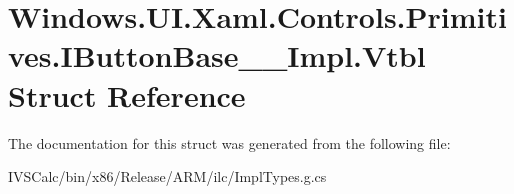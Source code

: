 \hypertarget{struct_windows_1_1_u_i_1_1_xaml_1_1_controls_1_1_primitives_1_1_i_button_base_____impl_1_1_vtbl}{}\section{Windows.\+U\+I.\+Xaml.\+Controls.\+Primitives.\+I\+Button\+Base\+\_\+\+\_\+\+Impl.\+Vtbl Struct Reference}
\label{struct_windows_1_1_u_i_1_1_xaml_1_1_controls_1_1_primitives_1_1_i_button_base_____impl_1_1_vtbl}


The documentation for this struct was generated from the following file\+:\begin{DoxyCompactItemize}
\item 
I\+V\+S\+Calc/bin/x86/\+Release/\+A\+R\+M/ilc/Impl\+Types.\+g.\+cs\end{DoxyCompactItemize}
